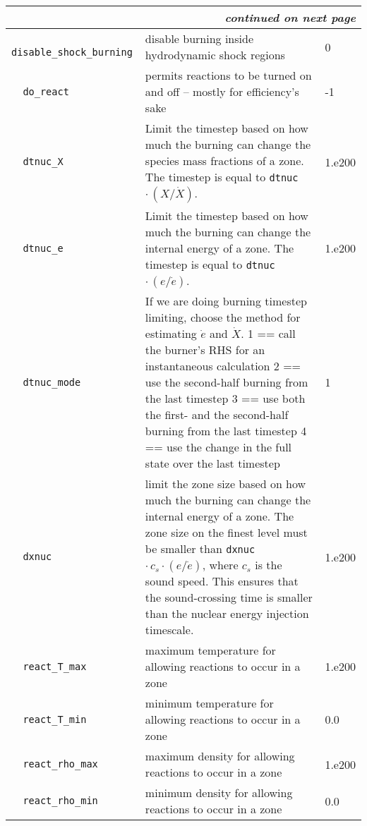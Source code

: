 \begin{landscape}
{\begin{center}
\begin{longtable}{|l|p{5.25in}|l|}
\multicolumn{3}{|r|}{{\em continued on next page}} \\ \hline
\endfoot

\hline 
\endlastfoot


\rowcolor{tableShade}
\verb=  disable_shock_burning  = &   disable burning inside hydrodynamic shock regions  &  0 \\
\verb=  do_react  = &   permits reactions to be turned on and off -- mostly for efficiency's sake  &  -1 \\
\rowcolor{tableShade}
\verb=  dtnuc_X  = &   Limit the timestep based on how much the burning can change the species mass fractions of a zone. The timestep is equal to {\tt dtnuc}  $\cdot\,(X / \dot{X})$.  &  1.e200 \\
\verb=  dtnuc_e  = &   Limit the timestep based on how much the burning can change the internal energy of a zone. The timestep is equal to {\tt dtnuc}  $\cdot\,(e / \dot{e})$.  &  1.e200 \\
\rowcolor{tableShade}
\verb=  dtnuc_mode  = &   If we are doing burning timestep limiting, choose the method for estimating $\dot{e}$ and $\dot{X}$. 1 == call the burner's RHS for an instantaneous calculation 2 == use the second-half burning from the last timestep 3 == use both the first- and the second-half burning from the last timestep 4 == use the change in the full state over the last timestep  &  1 \\
\verb=  dxnuc  = &   limit the zone size based on how much the burning can change the internal energy of a zone. The zone size on the finest level must be smaller than {\tt dxnuc} $\cdot\, c_s\cdot (e / \dot{e})$, where $c_s$ is the sound speed. This ensures that the sound-crossing time is smaller than the nuclear energy injection timescale.  &  1.e200 \\
\rowcolor{tableShade}
\verb=  react_T_max  = &   maximum temperature for allowing reactions to occur in a zone  &  1.e200 \\
\verb=  react_T_min  = &   minimum temperature for allowing reactions to occur in a zone  &  0.0 \\
\rowcolor{tableShade}
\verb=  react_rho_max  = &   maximum density for allowing reactions to occur in a zone  &  1.e200 \\
\verb=  react_rho_min  = &   minimum density for allowing reactions to occur in a zone  &  0.0 \\


\end{longtable}
\end{center}

}
\end{landscape}
